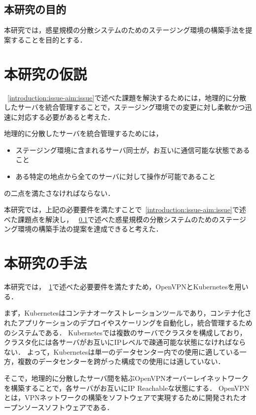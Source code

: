\subsection{本研究の目的}
\label{introduction:issue-aim:aim}

本研究では，惑星規模の分散システムのためのステージング環境の構築手法を提案することを目的とする．

\section{本研究の仮説}
\label{introduction:hypothesis}

~\ref{introduction:issue-aim:issue}で述べた課題を解決するためには，地理的に分散したサーバを統合管理することで，ステージング環境での変更に対し柔軟かつ迅速に対応する必要があると考えた．

地理的に分散したサーバを統合管理するためには，
\begin{itemize}
  \item ステージング環境に含まれるサーバ同士が，お互いに通信可能な状態であること
  \item ある特定の地点から全てのサーバに対して操作が可能であること
\end{itemize}
の二点を満たさなければならない．

本研究では，上記の必要要件を満たすことで~\ref{introduction:issue-aim:issue}で述べた課題点を解決し，
~\ref{introduction:issue-aim:aim}で述べた惑星規模の分散システムのためのステージング環境の構築手法の提案を達成できると考えた．

\section{本研究の手法}
\label{introduction:proposal}

本研究では，~\ref{introduction:hypothesis}で述べた必要要件を満たすため，OpenVPNとKubernetesを用いる．

まず，Kubernetesはコンテナオーケストレーションツールであり，コンテナ化されたアプリケーションのデプロイやスケーリングを自動化し，統合管理するためのシステムである．
Kubernetesでは複数のサーバでクラスタを構成しており，クラスタ化には各サーバがお互いにIPレベルで疎通可能な状態になければならない．
よって，Kubernetesは単一のデータセンター内での使用に適している一方，複数のデータセンターを跨がった構成での使用には適していない．

そこで，地理的に分散したサーバ間を結ぶOpenVPNオーバーレイネットワークを構築することで，各サーバがお互いにIP Reachableな状態にする．
OpenVPNとは，VPNネットワークの構築をソフトウェアで実現するために開発されたオープンソースソフトウェアである．

